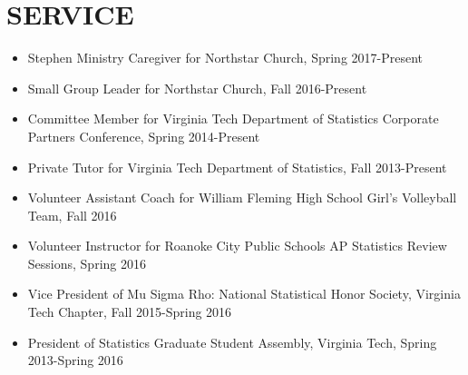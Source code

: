 \documentclass[10pt]{article}
\begin{document}
\section*{SERVICE}
\begin{itemize}
\item Stephen Ministry Caregiver for Northstar Church, Spring 2017-Present
\item Small Group Leader for Northstar Church, Fall 2016-Present
\item Committee Member for Virginia Tech Department of Statistics Corporate Partners Conference, Spring 2014-Present
\item Private Tutor for Virginia Tech Department of Statistics, Fall 2013-Present
\item Volunteer Assistant Coach for William Fleming High School Girl's Volleyball Team, Fall 2016
\item Volunteer Instructor for Roanoke City Public Schools AP Statistics Review Sessions, Spring 2016
\item Vice President of Mu Sigma Rho: National Statistical Honor Society, Virginia Tech Chapter, Fall 2015-Spring 2016
\item President of Statistics Graduate Student Assembly, Virginia Tech, Spring 2013-Spring 2016

\end{itemize}

\end{document}
